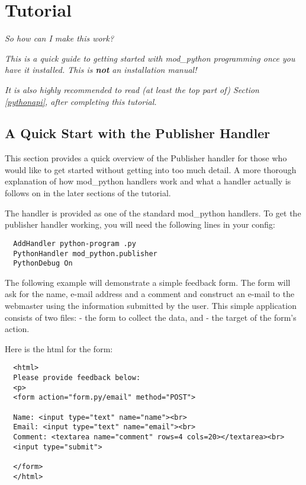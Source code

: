 \chapter{Tutorial\label{tutorial}}

\begin{flushright}
  \emph{So how can I make this work?}
\end{flushright}

\emph{This is a quick guide to getting started with mod_python 
  programming once you have it installed. This is \textbf{not} an
  installation manual!}

\emph{It is also highly recommended to read (at least the top part of)
  Section \ref{pythonapi},  after
  completing this tutorial.}

\section{A Quick Start with the Publisher Handler\label{tut-pub}}

This section provides a quick overview of the Publisher handler for
those who would like to get started without getting into too much
detail. A more thorough explanation of how mod_python handlers work
and what a handler actually is follows on in the later sections of the
tutorial.

The  handler is provided as one of the standard
mod_python handlers. To get the publisher handler working, you will
need the following lines in your config:

\begin{verbatim}
  AddHandler python-program .py
  PythonHandler mod_python.publisher
  PythonDebug On
\end{verbatim}

The following example will demonstrate a simple feedback form. The
form will ask for the name, e-mail address and a comment and construct
an e-mail to the webmaster using the information submitted by the
user. This simple application consists of two files:
 - the form to collect the data, and
 - the target of the form's action.

Here is the html for the form:

\begin{verbatim}
  <html>
  Please provide feedback below:
  <p>                           
  <form action="form.py/email" method="POST">

  Name: <input type="text" name="name"><br>
  Email: <input type="text" name="email"><br>
  Comment: <textarea name="comment" rows=4 cols=20></textarea><br>
  <input type="submit">

  </form>
  </html>  
\end{verbatim}

